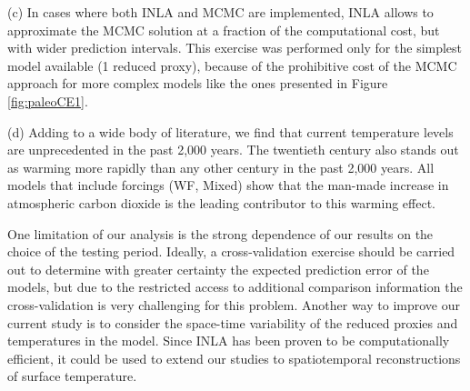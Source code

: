 \documentclass[12pt]{amsart}
\theoremstyle{plain}
\theoremstyle{definition}
\theoremstyle{remark}
\begin{document}
     \noindent (c) In cases where both INLA and MCMC are implemented, INLA allows to approximate the MCMC
      solution at a fraction of the computational cost, but with wider
      prediction intervals. This exercise was performed only for the simplest
      model available (1 reduced proxy), because of the prohibitive cost of the
      MCMC approach for more complex models like the ones presented in Figure
      \ref{fig:paleoCE1}. 
      
     \noindent (d) Adding to a wide body of literature, we find that current temperature levels are unprecedented in the past 2,000 years. 
      The twentieth century also stands out as warming more rapidly than any other
      century in the past 2,000 years. All models that include forcings (WF, Mixed) show that the man-made increase in atmospheric carbon dioxide is the leading contributor to this
      warming effect. 

One limitation of our analysis is the strong
dependence of our results on the choice of the testing period. Ideally, a
cross-validation exercise should be carried out to determine with greater
certainty the expected prediction error of the models, but due to the restricted access to
additional comparison information the cross-validation is very challenging for this problem. 
Another way to improve our current study is to consider the space-time variability of the reduced proxies and temperatures in the model. 
Since INLA has been proven to be computationally
efficient, it could be used to extend our studies to spatiotemporal reconstructions of surface temperature.



\end{document}
